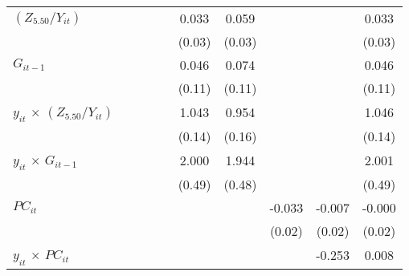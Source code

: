 \documentclass[12pt, a4paper]{article}
\begin{document}
\begin{table}[htbp]
\begin{threeparttable}
{\begin{tabular}{l*{9}{c}}
				$(Z_{5.50}/Y_{it})$          &                     &                     &                     &                     &       0.033         &       0.059         &                     &                     &       0.033         \\
				&                     &                     &                     &                     &      (0.03)         &      (0.03)         &                     &                     &      (0.03)         \\
				$G_{it-1}$            &                     &                     &                     &                     &       0.046         &       0.074         &                     &                     &       0.046         \\
				&                     &                     &                     &                     &      (0.11)         &      (0.11)         &                     &                     &      (0.11)         \\
				$y_{it}$ $\times$ $(Z_{5.50}/Y_{it})$&                     &                     &                     &                     &       1.043\sym{***}&       0.954\sym{***}&                     &                     &       1.046\sym{***}\\
				&                     &                     &                     &                     &      (0.14)         &      (0.16)         &                     &                     &      (0.14)         \\
				$y_{it}$ $\times$ $G_{it-1}$&                     &                     &                     &                     &       2.000\sym{***}&       1.944\sym{***}&                     &                     &       2.001\sym{***}\\
				&                     &                     &                     &                     &      (0.49)         &      (0.48)         &                     &                     &      (0.49)         \\
				$PC_{it}$                &                     &                     &                     &                     &                     &                     &      -0.033         &      -0.007         &      -0.000         \\
				&                     &                     &                     &                     &                     &                     &      (0.02)         &      (0.02)         &      (0.02)         \\
				$y_{it}$ $\times$ $PC_{it}$ &                     &                     &                     &                     &                     &                     &                     &      -0.253\sym{*}  &       0.008         \\

\end{tabular}}
\end{threeparttable}
\end{table}
\end{document}
